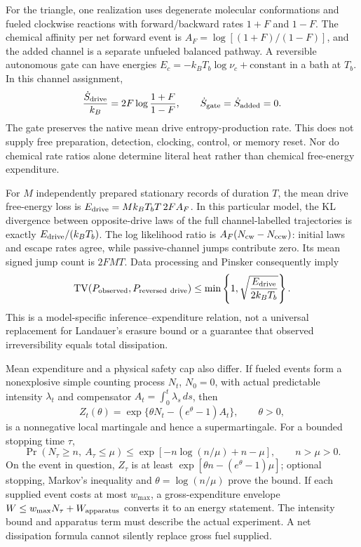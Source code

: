 For the triangle, one realization uses degenerate molecular conformations
and fueled clockwise reactions with forward/backward rates $1+F$ and $1-F$.
The chemical affinity per net forward event is
$A_F=\log[(1+F)/(1-F)]$, and the added channel is a separate unfueled
balanced pathway. A reversible autonomous gate can have energies
$E_c=-k_BT_b\log\nu_c+\mathrm{constant}$ in a bath at $T_b$. In this channel
assignment,
\begin{equation}
 \frac{\dot S_{\rm drive}}{k_B}=2F\log\frac{1+F}{1-F},\qquad
 \dot S_{\rm gate}=\dot S_{\rm added}=0.
 \label{eq:continuous-energy}
\end{equation}
The gate preserves the native mean drive entropy-production rate. This does
not supply free preparation, detection, clocking, control, or memory reset.
Nor do chemical rate ratios alone determine literal heat rather than chemical
free-energy expenditure.

For $M$ independently prepared stationary records of duration $T$, the mean
drive free-energy loss is
$E_{\rm drive}=Mk_BT_bT\,2F A_F$. In this particular model, the KL divergence
between opposite-drive laws of the full channel-labelled trajectories is
exactly $E_{\rm drive}/(k_BT_b)$. The log likelihood ratio is
$A_F(N_{\rm cw}-N_{\rm ccw})$: initial laws and escape rates agree, while
passive-channel jumps contribute zero. Its mean signed jump count is $2FMT$.
Data processing and Pinsker consequently imply
\begin{equation}
 \operatorname{TV}(P_{\rm observed},P_{\rm reversed\ drive})
 \leq\min\left\{1,\sqrt{\frac{E_{\rm drive}}{2k_BT_b}}\right\}.
\end{equation}
This is a model-specific inference--expenditure relation, not a universal
replacement for Landauer's erasure bound or a guarantee that observed
irreversibility equals total dissipation.

Mean expenditure and a physical safety cap also differ. If fueled events form
a nonexplosive simple counting process $N_t$, $N_0=0$, with actual predictable
intensity $\lambda_t$ and compensator $A_t=\int_0^t\lambda_s\,ds$, then
\begin{equation}
 Z_t(\theta)=\exp\{\theta N_t-(e^\theta-1)A_t\},\qquad\theta>0,
\end{equation}
is a nonnegative local martingale and hence a supermartingale. For a bounded
stopping time $\tau$,
\begin{equation}
 \Pr(N_\tau\geq n,\ A_\tau\leq\mu)
 \leq\exp[-n\log(n/\mu)+n-\mu],\qquad n>\mu>0.
 \label{eq:continuous-energy-tail}
\end{equation}
On the event in question, $Z_\tau$ is at least
$\exp[\theta n-(e^\theta-1)\mu]$; optional stopping, Markov's inequality and
$\theta=\log(n/\mu)$ prove the bound. If each supplied event costs at most
$w_{\max}$, a gross-expenditure envelope
$W\leq w_{\max}N_\tau+W_{\rm apparatus}$ converts it to an energy statement.
The intensity bound and apparatus term must describe the actual experiment.
A net dissipation formula cannot silently replace gross fuel supplied.


